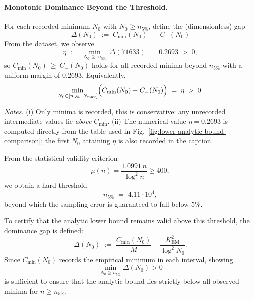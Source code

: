 \documentclass[11pt]{article}
\makeatletter
\theoremstyle{inline}
\theoremstyle{break}
\renewenvironment{proof}[1][\proofname]{%
  \par\pushQED{\qed}%
  \normalfont \topsep6\p@\@plus6\p@\relax
  \trivlist
  \item[\hskip\labelsep
        \itshape
    #1\@addpunct{.}]\mbox{}\\  %
}{%
  \popQED\endtrivlist\@endpefalse
}
\theoremstyle{break}
\theoremstyle{break}
\theoremstyle{break}
\theoremstyle{break}
\theoremstyle{break}
\theoremstyle{break}
\theoremstyle{inline}
\newcommand{\xNzeroStat}{71633} %
\newcommand{\xEtaStat}{0.2693} %
\newcommand{\Cmeas}{C}              %
\newcommand{\CminusProduct}{C_{-}}
\newcommand{\Kem}{K_{\mathrm{EM}}}              %
\makeatother
\begin{document}
\begin{proof}
\paragraph{Monotonic Dominance Beyond the Threshold.}
For each recorded minimum \(N_0\) with \(N_0\ge n_{5\%}\), define the (dimensionless) gap
\begin{equation}
\Delta(N_0)\;:=\;\Cmeas_{\min}(N_0)\;-\;\CminusProduct(N_0)
\end{equation}
From the dataset, we observe
\begin{equation}
\eta\;:=\;\min_{N_0\ \ge\ n_{5\%}}\ \Delta(\xNzeroStat)\;=\;\xEtaStat\;>\;0,
\end{equation}
so \(\Cmeas_{\min}(N_0)\ \ge\ \CminusProduct(N_0)\) holds for all recorded minima beyond \(n_{5\%}\) with a uniform margin of \(\xEtaStat\).
Equivalently,
\begin{equation}
\min_{N_0\in[n_{5\%},\,N_{\max}]}\Bigl(\Cmeas_{\min}(N_0)-\CminusProduct(N_0)\Bigr) \;=\; \eta \;>\; 0.
\end{equation}

\noindent\emph{Notes.}
(i) Only minima is recorded, this is conservative: any unrecorded intermediate values lie \emph{above} \(\Cmeas_{\min}\).
(ii) The numerical value \(\eta=\xEtaStat\) is computed directly from the table used in Fig.~\ref{fig:lower-analytic-bound-comparison}; the first \(N_0\) attaining \(\eta\) is also recorded in the caption.

From the statistical validity criterion
\begin{equation}
\mu(n) = \frac{1.0991\,n}{\log^2 n} \ge 400,
\end{equation}
we obtain a hard threshold
\begin{equation}
n_{5\%} \;=\; 4.11\cdot 10^4,
\end{equation}
beyond which the sampling error is guaranteed to fall below \( 5\% \).

To certify that the analytic lower bound remains valid above this threshold, the dominance gap is defined:
\begin{equation}
\Delta(N_0) \;:=\; \frac{\Cmeas_{\min}(N_0)}{M} - \frac{\Kem^2}{\log^2 N_0}.
\end{equation}
Since \( \Cmeas_{\min}(N_0) \) records the empirical minimum in each interval, showing
\begin{equation}
\min_{N_0 \ge n_{5\%}} \Delta(N_0) > 0
\end{equation}
is sufficient to ensure that the analytic bound lies strictly below all observed minima for \( n \ge n_{5\%} \).


\end{proof}
\end{document}
